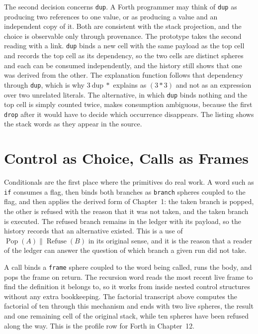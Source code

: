 \documentclass[11pt,oneside]{report}
\newcommand{\Pop}{\operatorname{Pop}}
\newcommand{\Refuse}{\operatorname{Refuse}}
\theoremstyle{plain}
\theoremstyle{definition}
\theoremstyle{remark}
\newcommand{\code}[2][Python]{}
\newcommand{\transcript}[1]{}
\begin{document}
\transcript{forth}

The second decision concerns \texttt{dup}. A Forth programmer may think of \texttt{dup} as producing two references to one value, or as producing a value and an independent copy of it. Both are consistent with the stack projection, and the choice is observable only through provenance. The prototype takes the second reading with a link. \texttt{dup} binds a new cell with the same payload as the top cell and records the top cell as its dependency, so the two cells are distinct spheres and each can be consumed independently, and the history still shows that one was derived from the other. The explanation function follows that dependency through \texttt{dup}, which is why $3\ \mathrm{dup}\ {*}$ explains as $(3 * 3)$ and not as an expression over two unrelated literals. The alternative, in which \texttt{dup} binds nothing and the top cell is simply counted twice, makes consumption ambiguous, because the first \texttt{drop} after it would have to decide which occurrence disappears. The listing shows the stack words as they appear in the source.

\code{ex_forth_stack}

\section{Control as Choice, Calls as Frames}

Conditionals are the first place where the primitives do real work. A word such as \texttt{if} consumes a flag, then binds both branches as \texttt{branch} spheres coupled to the flag, and then applies the derived form of Chapter~1: the taken branch is popped, the other is refused with the reason that it was not taken, and the taken branch is executed. The refused branch remains in the ledger with its payload, so the history records that an alternative existed. This is a use of $\Pop(A)\parallel\Refuse(B)$ in its original sense, and it is the reason that a reader of the ledger can answer the question of which branch a given run did not take.

\code{ex_forth_if}

A call binds a \texttt{frame} sphere coupled to the word being called, runs the body, and pops the frame on return. The recursion word reads the most recent live frame to find the definition it belongs to, so it works from inside nested control structures without any extra bookkeeping. The factorial transcript above computes the factorial of ten through this mechanism and ends with two live spheres, the result and one remaining cell of the original stack, while ten spheres have been refused along the way. This is the profile row for Forth in Chapter~12.
\end{document}
